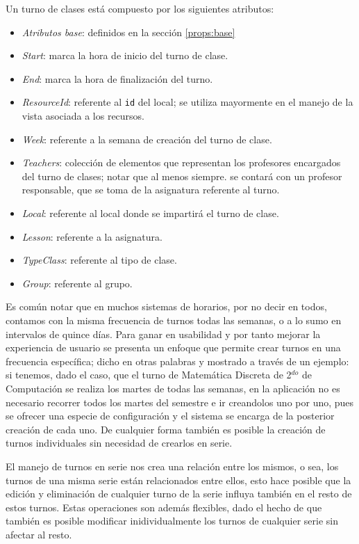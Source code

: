 Un turno de clases está compuesto por los siguientes atributos:
\begin{itemize}
	\item \textit{Atributos base}: definidos en la sección \ref{props:base}
	\item \textit{Start}: marca la hora de inicio del turno de clase.
	\item \textit{End}: marca la hora de finalización del turno.
	\item \textit{ResourceId}: referente al \texttt{id} del local; se utiliza mayormente en el manejo de la vista asociada a los recursos.
	\item \textit{Week}: referente a la semana de creación del turno de clase.
	\item \textit{Teachers}: colección de elementos que representan los profesores encargados del turno de clases; notar que al menos siempre. se contará con un profesor responsable, que se toma de la asignatura referente al turno.\item \textit{Local}: referente al local donde se impartirá el turno de clase.
	\item \textit{Lesson}: referente a la asignatura.
	\item \textit{TypeClass}: referente al tipo de clase.
	\item \textit{Group}: referente al grupo.
\end{itemize}

Es común notar que en muchos sistemas de horarios, por no decir en todos, contamos con la misma frecuencia de turnos todas las semanas, o a lo sumo en intervalos de quince días. Para ganar en usabilidad y por tanto mejorar la experiencia de usuario se presenta un enfoque que permite crear turnos en una frecuencia específica; dicho en otras palabras y mostrado a través de un ejemplo: si tenemos, dado el caso, que el turno de Matemática Discreta de 2$^{do}$ de Computación se realiza los martes de todas las semanas, en la aplicación no es necesario recorrer todos los martes del semestre e ir creandolos uno por uno, pues se ofrecer una especie de configuración y el sistema se encarga de la posterior creación de cada uno. De cualquier forma también  es posible la creación de turnos individuales sin necesidad de crearlos en serie.

El manejo de turnos en serie nos crea una relación entre los mismos, o sea, los turnos de una misma serie están relacionados entre ellos, esto hace posible que la edición y eliminación de cualquier turno de la serie influya también en el resto de estos turnos. Estas operaciones son además flexibles, dado el hecho de que también es posible modificar inidividualmente los turnos de cualquier serie sin afectar al resto.

